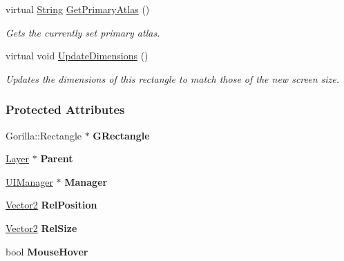 \begin{DoxyCompactItemize}
virtual \hyperlink{namespacephys_aa03900411993de7fbfec4789bc1d392e}{String} \hyperlink{classphys_1_1UI_1_1Rectangle_ab4fe2f73e386c9735ad17789ce6cc51a}{GetPrimaryAtlas} ()
\begin{DoxyCompactList}\small\item\em Gets the currently set primary atlas. \item\end{DoxyCompactList}\item 
virtual void \hyperlink{classphys_1_1UI_1_1Rectangle_a090cfa5a1298c333335258d52d81c017}{UpdateDimensions} ()
\begin{DoxyCompactList}\small\item\em Updates the dimensions of this rectangle to match those of the new screen size. \item\end{DoxyCompactList}\end{DoxyCompactItemize}
\subsubsection*{Protected Attributes}
\begin{DoxyCompactItemize}
\item 
\hypertarget{classphys_1_1UI_1_1Rectangle_a2646b0bcc1602757852c21fd70e169cc}{
Gorilla::Rectangle $\ast$ {\bfseries GRectangle}}
\label{classphys_1_1UI_1_1Rectangle_a2646b0bcc1602757852c21fd70e169cc}

\item 
\hypertarget{classphys_1_1UI_1_1Rectangle_ac54c65c81e321d6ba3c58f32af71d407}{
\hyperlink{classphys_1_1UI_1_1Layer}{Layer} $\ast$ {\bfseries Parent}}
\label{classphys_1_1UI_1_1Rectangle_ac54c65c81e321d6ba3c58f32af71d407}

\item 
\hypertarget{classphys_1_1UI_1_1Rectangle_a3c78c2e48573d00290f3374e53971a4c}{
\hyperlink{classphys_1_1UIManager}{UIManager} $\ast$ {\bfseries Manager}}
\label{classphys_1_1UI_1_1Rectangle_a3c78c2e48573d00290f3374e53971a4c}

\item 
\hypertarget{classphys_1_1UI_1_1Rectangle_ae059b550f2d6c490f769bcab07b37910}{
\hyperlink{classphys_1_1Vector2}{Vector2} {\bfseries RelPosition}}
\label{classphys_1_1UI_1_1Rectangle_ae059b550f2d6c490f769bcab07b37910}

\item 
\hypertarget{classphys_1_1UI_1_1Rectangle_acac4d6cf1b71363d9c27f900b215667e}{
\hyperlink{classphys_1_1Vector2}{Vector2} {\bfseries RelSize}}
\label{classphys_1_1UI_1_1Rectangle_acac4d6cf1b71363d9c27f900b215667e}

\item 
\hypertarget{classphys_1_1UI_1_1Rectangle_a98b63e58485ebb065c1ad62dc39ac63b}{
bool {\bfseries MouseHover}}
\label{classphys_1_1UI_1_1Rectangle_a98b63e58485ebb065c1ad62dc39ac63b}

\end{DoxyCompactItemize}


